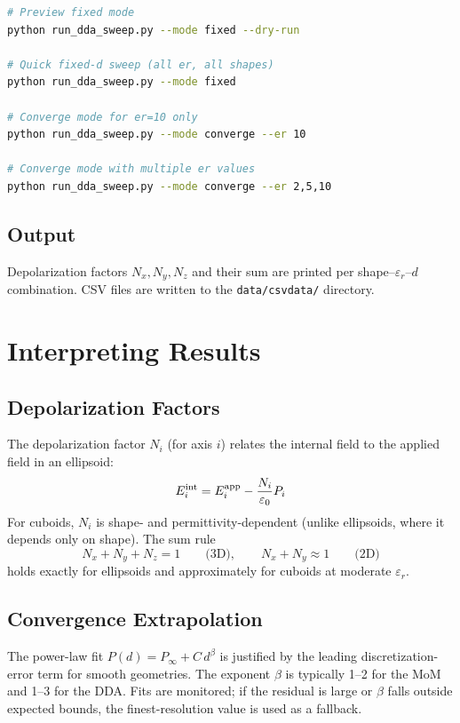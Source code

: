 \documentclass[a4paper,11pt]{article}
\begin{document}
\begin{lstlisting}[language=bash]
# Preview fixed mode
python run_dda_sweep.py --mode fixed --dry-run

# Quick fixed-d sweep (all er, all shapes)
python run_dda_sweep.py --mode fixed

# Converge mode for er=10 only
python run_dda_sweep.py --mode converge --er 10

# Converge mode with multiple er values
python run_dda_sweep.py --mode converge --er 2,5,10
\end{lstlisting}

\subsection{Output}

Depolarization factors $N_x, N_y, N_z$ and their sum are printed per
shape--$\varepsilon_r$--$d$ combination.  CSV files are written to the
\texttt{data/csvdata/} directory.

\section{Interpreting Results}

\subsection{Depolarization Factors}

The depolarization factor $N_i$ (for axis $i$) relates the internal field to
the applied field in an ellipsoid:
\[
E_i^{\rm int} = E_i^{\rm app} - \frac{N_i}{\varepsilon_0} P_i
\]
For cuboids, $N_i$ is shape- and permittivity-dependent (unlike ellipsoids,
where it depends only on shape).  The sum rule
\[
N_x + N_y + N_z = 1 \qquad \text{(3D)},\qquad
N_x + N_y \approx 1 \qquad \text{(2D)}
\]
holds exactly for ellipsoids and approximately for cuboids at moderate
$\varepsilon_r$.

\subsection{Convergence Extrapolation}

The power-law fit $P(d) = P_\infty + C\,d^\beta$ is justified by the leading
discretization-error term for smooth geometries.  The exponent $\beta$ is
typically 1--2 for the MoM and 1--3 for the DDA.  Fits are monitored;
if the residual is large or $\beta$ falls outside expected bounds,
the finest-resolution value is used as a fallback.
\end{document}
